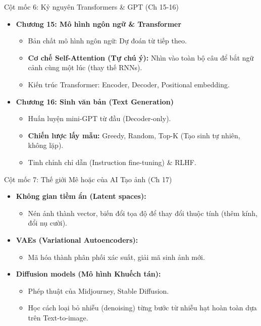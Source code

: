 \documentclass[aspectratio=169]{beamer}
\begin{document}
\begin{frame}{Cột mốc 6: Kỷ nguyên Transformers \& GPT (Ch 15-16)}
    \begin{itemize}
        \item \textbf{Chương 15: Mô hình ngôn ngữ \& Transformer}
        \begin{itemize}
            \item Bản chất mô hình ngôn ngữ: Dự đoán từ tiếp theo.
            \item \textbf{Cơ chế Self-Attention (Tự chú ý):} Nhìn vào toàn bộ câu để bắt ngữ cảnh cùng một lúc (thay thế RNNs).
            \item Kiến trúc Transformer: Encoder, Decoder, Positional embedding.
        \end{itemize}
        \item \textbf{Chương 16: Sinh văn bản (Text Generation)}
        \begin{itemize}
            \item Huấn luyện mini-GPT từ đầu (Decoder-only).
            \item \textbf{Chiến lược lấy mẫu:} Greedy, Random, Top-K (Tạo sinh tự nhiên, không lặp).
            \item Tinh chỉnh chỉ dẫn (Instruction fine-tuning) \& RLHF.
        \end{itemize}
    \end{itemize}
\end{frame}

\begin{frame}{Cột mốc 7: Thế giới Mê hoặc của AI Tạo ảnh (Ch 17)}
    \begin{itemize}
        \item \textbf{Không gian tiềm ẩn (Latent spaces):}
        \begin{itemize}
            \item Nén ảnh thành vector, biến đổi tọa độ để thay đổi thuộc tính (thêm kính, đổi nụ cười).
        \end{itemize}
        \item \textbf{VAEs (Variational Autoencoders):}
        \begin{itemize}
            \item Mã hóa thành phân phối xác suất, giải mã sinh ảnh mới.
        \end{itemize}
        \item \textbf{Diffusion models (Mô hình Khuếch tán):}
        \begin{itemize}
            \item Phép thuật của Midjourney, Stable Diffusion.
            \item Học cách loại bỏ nhiễu (denoising) từng bước từ nhiễu hạt hoàn toàn dựa trên Text-to-image.
        \end{itemize}
    \end{itemize}
\end{frame}
\end{document}
